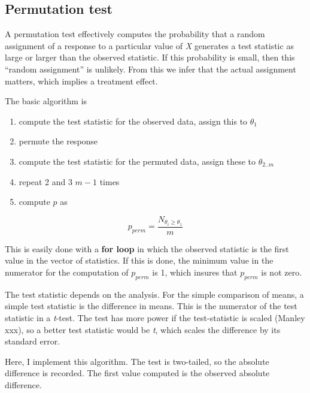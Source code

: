 \documentclass[]{book}
\providecommand{\tightlist}{%
  \setlength{\itemsep}{0pt}\setlength{\parskip}{0pt}}
\begin{document}
\subsection{Permutation test}\label{permutation-test}

A permutation test effectively computes the probability that a random
assignment of a response to a particular value of \emph{X} generates a
test statistic as large or larger than the observed statistic. If this
probability is small, then this ``random assignment'' is unlikely. From
this we infer that the actual assignment matters, which implies a
treatment effect.

The basic algorithm is

\begin{enumerate}
\def\labelenumi{\arabic{enumi}.}
\tightlist
\item
  compute the test statistic for the observed data, assign this to
  \(\theta_1\)
\item
  permute the response
\item
  compute the test statistic for the permuted data, assign these to
  \(\theta_{2..m}\)
\item
  repeat 2 and 3 \(m-1\) times
\item
  compute \(p\) as
\end{enumerate}

\begin{equation}
p_{perm} = \frac{N_{\theta_i \ge \theta_{1}}}{m}
\end{equation}

This is easily done with a \textbf{for loop} in which the observed
statistic is the first value in the vector of statistics. If this is
done, the minimum value in the numerator for the computation of
\(p_{perm}\) is 1, which insures that \(p_{perm}\) is not zero.

The test statistic depends on the analysis. For the simple comparison of
means, a simple test statistic is the difference in means. This is the
numerator of the test statistic in a \emph{t}-test. The test has more
power if the test-statistic is scaled (Manley xxx), so a better test
statistic would be \emph{t}, which scales the difference by its standard
error.

Here, I implement this algorithm. The test is two-tailed, so the
absolute difference is recorded. The first value computed is the
observed absolute difference.
\end{document}
